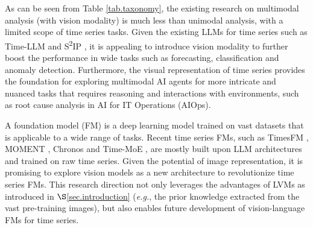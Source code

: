 \vspace{0.2cm}


 As can be seen from Table \ref{tab.taxonomy}, the existing research on multimodal analysis (with vision modality) is much less than unimodal analysis, with a limited scope of time series tasks. Given the existing LLMs for time series such as Time-LLM \cite{jin2024time} and S\textsuperscript{2}IP \cite{pan2024s}, it is appealing to introduce vision modality %
to further boost the performance in wide tasks such as forecasting, classification and anomaly detection. Furthermore, the visual representation of time series provides the foundation for exploring multimodal AI agents \cite{xie2024large} for more intricate and nuanced tasks that requires reasoning and interactions with environments, such as %
root cause analysis in AI for IT Operations (AIOps).%

\vspace{0.2cm}


 A foundation model (FM) is a deep learning model trained on vast datasets that is applicable to a wide range of tasks. Recent time series FMs, such as TimesFM \cite{das2024decoder}, MOMENT \cite{goswami2024moment}, Chronos \cite{ansari2024chronos} and Time-MoE \cite{shi2024time}, are mostly built upon LLM architectures and trained on raw time series. Given the potential of image representation, %
it is promising to explore vision models as a new architecture to revolutionize time series FMs. This research direction not only leverages the advantages of LVMs as introduced in $\S$\ref{sec.introduction} ({\em e.g.}, the %
prior knowledge extracted from the vast pre-training images), but also enables future development of vision-language FMs for time series. %





